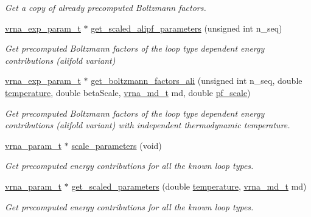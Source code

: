 \begin{DoxyCompactItemize}
\begin{DoxyCompactList}\small\item\em Get a copy of already precomputed Boltzmann factors. \end{DoxyCompactList}\item 
\hyperlink{group__energy__parameters_ga01d8b92fe734df8d79a6169482c7d8d8}{vrna\-\_\-exp\-\_\-param\-\_\-t} $\ast$ \hyperlink{group__energy__parameters_ga0ccf4e1be085a573533fd6b9da2d8cf9}{get\-\_\-scaled\-\_\-alipf\-\_\-parameters} (unsigned int n\-\_\-seq)
\begin{DoxyCompactList}\small\item\em Get precomputed Boltzmann factors of the loop type dependent energy contributions (alifold variant) \end{DoxyCompactList}\item 
\hyperlink{group__energy__parameters_ga01d8b92fe734df8d79a6169482c7d8d8}{vrna\-\_\-exp\-\_\-param\-\_\-t} $\ast$ \hyperlink{group__energy__parameters_ga2aa1d87c97f35d2e4121634a17556829}{get\-\_\-boltzmann\-\_\-factors\-\_\-ali} (unsigned int n\-\_\-seq, double \hyperlink{group__model__details_gab4b11c8d9c758430960896bc3fe82ead}{temperature}, double beta\-Scale, \hyperlink{group__model__details_ga1f8a10e12a0a1915f2a4eff0b28ea17c}{vrna\-\_\-md\-\_\-t} md, double \hyperlink{group__model__details_gad3b22044065acc6dee0af68931b52cfd}{pf\-\_\-scale})
\begin{DoxyCompactList}\small\item\em Get precomputed Boltzmann factors of the loop type dependent energy contributions (alifold variant) with independent thermodynamic temperature. \end{DoxyCompactList}\item 
\hyperlink{group__energy__parameters_ga8a69ca7d787e4fd6079914f5343a1f35}{vrna\-\_\-param\-\_\-t} $\ast$ \hyperlink{group__energy__parameters_ga541f2cf7436e9bc939b0a49b24baf987}{scale\-\_\-parameters} (void)
\begin{DoxyCompactList}\small\item\em Get precomputed energy contributions for all the known loop types. \end{DoxyCompactList}\item 
\hyperlink{group__energy__parameters_ga8a69ca7d787e4fd6079914f5343a1f35}{vrna\-\_\-param\-\_\-t} $\ast$ \hyperlink{group__energy__parameters_ga7fa6a000d7c16feab939f2c4ee626197}{get\-\_\-scaled\-\_\-parameters} (double \hyperlink{group__model__details_gab4b11c8d9c758430960896bc3fe82ead}{temperature}, \hyperlink{group__model__details_ga1f8a10e12a0a1915f2a4eff0b28ea17c}{vrna\-\_\-md\-\_\-t} md)
\begin{DoxyCompactList}\small\item\em Get precomputed energy contributions for all the known loop types. \end{DoxyCompactList}\end{DoxyCompactItemize}


